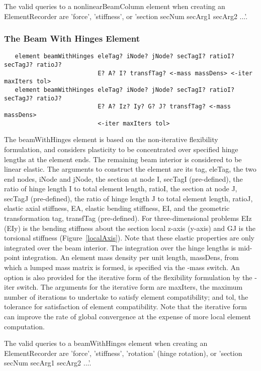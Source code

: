 \documentclass[12pt]{article}
\begin{document}
The valid queries to a nonlinearBeamColumn element when creating an
ElementRecorder are 'force', 'stiffness', or 'section secNum secArg1 secArg2 ...'.

\subsubsection{The Beam With Hinges Element}
{\sf\small
\begin{verbatim}
   element beamWithHinges eleTag? iNode? jNode? secTagI? ratioI? secTagJ? ratioJ?
                          E? A? I? transfTag? <-mass massDens> <-iter maxIters tol> 
   element beamWithHinges eleTag? iNode? jNode? secTagI? ratioI? secTagJ? ratioJ?
                          E? A? Iz? Iy? G? J? transfTag? <-mass massDens>
                          <-iter maxIters tol> 
\end{verbatim}
}

\noindent The beamWithHinges element is based on the non-iterative flexibility
formulation, and considers plasticity to be concentrated over
specified hinge lengths at the element ends. The remaining beam
interior is considered to be linear elastic. The arguments to
construct the element are its tag, eleTag, the two end nodes, iNode
and jNode, the section at node I, secTagI (pre-defined), the ratio of
hinge length I to total element length, ratioI, the section at node J,
secTagJ (pre-defined), the ratio of hinge length J to total element
length, ratioJ, elastic axial stiffness, EA, elastic bending
stiffness, EI, and the geometric transformation tag, transfTag
(pre-defined). For three-dimensional problems EIz (EIy) is the bending
stiffness about the section local z-axis (y-axis) and GJ is the
torsional stiffness (Figure~\ref{localAxis}). Note that these elastic
properties are only integrated over the beam interior. The integration
over the hinge lengths is mid-point integration. An element mass
density per unit length, massDens, from which a lumped mass matrix 
is formed, is specified via the -mass switch. An option is also
provided for the iterative form of the flexibility formulation by the
-iter switch. The arguments for the iterative form are maxIters, the
maximum number of iterations to undertake to satisfy element
compatibility; and tol, the tolerance for satisfaction of element
compatibility. Note that the iterative form can improve the rate of
global convergence at the expense of more local element computation. 

The valid queries to a beamWithHinges element when creating an
ElementRecorder are 'force', 'stiffness', 'rotation' (hinge rotation),
or 'section secNum secArg1 secArg2 ...'. 
\end{document}
